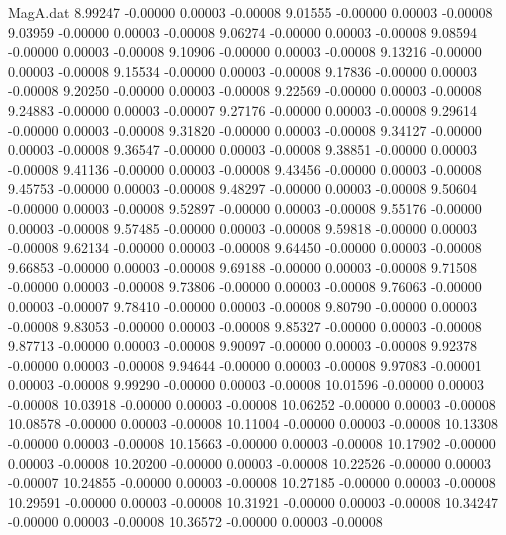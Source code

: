 \begin{filecontents}{MagA.dat}
   8.99247   -0.00000    0.00003   -0.00008
   9.01555   -0.00000    0.00003   -0.00008
   9.03959   -0.00000    0.00003   -0.00008
   9.06274   -0.00000    0.00003   -0.00008
   9.08594   -0.00000    0.00003   -0.00008
   9.10906   -0.00000    0.00003   -0.00008
   9.13216   -0.00000    0.00003   -0.00008
   9.15534   -0.00000    0.00003   -0.00008
   9.17836   -0.00000    0.00003   -0.00008
   9.20250   -0.00000    0.00003   -0.00008
   9.22569   -0.00000    0.00003   -0.00008
   9.24883   -0.00000    0.00003   -0.00007
   9.27176   -0.00000    0.00003   -0.00008
   9.29614   -0.00000    0.00003   -0.00008
   9.31820   -0.00000    0.00003   -0.00008
   9.34127   -0.00000    0.00003   -0.00008
   9.36547   -0.00000    0.00003   -0.00008
   9.38851   -0.00000    0.00003   -0.00008
   9.41136   -0.00000    0.00003   -0.00008
   9.43456   -0.00000    0.00003   -0.00008
   9.45753   -0.00000    0.00003   -0.00008
   9.48297   -0.00000    0.00003   -0.00008
   9.50604   -0.00000    0.00003   -0.00008
   9.52897   -0.00000    0.00003   -0.00008
   9.55176   -0.00000    0.00003   -0.00008
   9.57485   -0.00000    0.00003   -0.00008
   9.59818   -0.00000    0.00003   -0.00008
   9.62134   -0.00000    0.00003   -0.00008
   9.64450   -0.00000    0.00003   -0.00008
   9.66853   -0.00000    0.00003   -0.00008
   9.69188   -0.00000    0.00003   -0.00008
   9.71508   -0.00000    0.00003   -0.00008
   9.73806   -0.00000    0.00003   -0.00008
   9.76063   -0.00000    0.00003   -0.00007
   9.78410   -0.00000    0.00003   -0.00008
   9.80790   -0.00000    0.00003   -0.00008
   9.83053   -0.00000    0.00003   -0.00008
   9.85327   -0.00000    0.00003   -0.00008
   9.87713   -0.00000    0.00003   -0.00008
   9.90097   -0.00000    0.00003   -0.00008
   9.92378   -0.00000    0.00003   -0.00008
   9.94644   -0.00000    0.00003   -0.00008
   9.97083   -0.00001    0.00003   -0.00008
   9.99290   -0.00000    0.00003   -0.00008
  10.01596   -0.00000    0.00003   -0.00008
  10.03918   -0.00000    0.00003   -0.00008
  10.06252   -0.00000    0.00003   -0.00008
  10.08578   -0.00000    0.00003   -0.00008
  10.11004   -0.00000    0.00003   -0.00008
  10.13308   -0.00000    0.00003   -0.00008
  10.15663   -0.00000    0.00003   -0.00008
  10.17902   -0.00000    0.00003   -0.00008
  10.20200   -0.00000    0.00003   -0.00008
  10.22526   -0.00000    0.00003   -0.00007
  10.24855   -0.00000    0.00003   -0.00008
  10.27185   -0.00000    0.00003   -0.00008
  10.29591   -0.00000    0.00003   -0.00008
  10.31921   -0.00000    0.00003   -0.00008
  10.34247   -0.00000    0.00003   -0.00008
  10.36572   -0.00000    0.00003   -0.00008

\end{filecontents}
